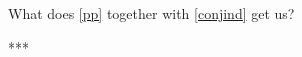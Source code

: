 \documentclass[If.tex]{subfiles}
\begin{document}
What does \ref{pp} together with \ref{conjind} get us?  

***





\end{document}
